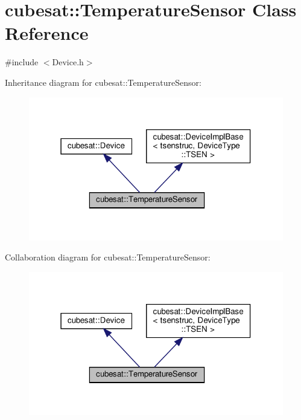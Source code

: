 \hypertarget{classcubesat_1_1TemperatureSensor}{}\section{cubesat\+:\+:Temperature\+Sensor Class Reference}
\label{classcubesat_1_1TemperatureSensor}


{\ttfamily \#include $<$Device.\+h$>$}



Inheritance diagram for cubesat\+:\+:Temperature\+Sensor\+:
\nopagebreak
\begin{figure}[H]
\begin{center}
\leavevmode
\includegraphics[width=316pt]{classcubesat_1_1TemperatureSensor__inherit__graph}
\end{center}
\end{figure}


Collaboration diagram for cubesat\+:\+:Temperature\+Sensor\+:
\nopagebreak
\begin{figure}[H]
\begin{center}
\leavevmode
\includegraphics[width=316pt]{classcubesat_1_1TemperatureSensor__coll__graph}
\end{center}
\end{figure}
